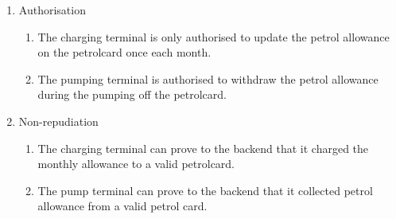 \begin{enumerate}
\item Authorisation
	\begin{enumerate}
	\item The charging terminal is only authorised to update the petrol allowance on the petrolcard once each month.
	\item The pumping terminal is authorised to withdraw the petrol allowance during the pumping off the petrolcard.
	\end{enumerate}


\item Non-repudiation
	\begin{enumerate}
		\item The charging terminal can prove to the backend that it charged the monthly allowance to a valid petrolcard. 
		\item The pump terminal can prove to the backend that it collected petrol allowance from a valid petrol card.
	\end{enumerate}

\end{enumerate}
